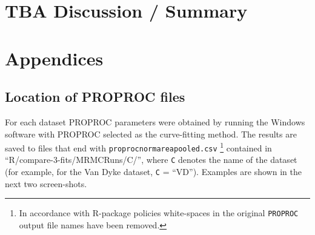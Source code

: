 \documentclass[
]{book}
\begin{document}
\hypertarget{rsm-3-fits-discussion-summary}{%
\section{TBA Discussion / Summary}\label{rsm-3-fits-discussion-summary}}

\hypertarget{rsm-3-fits-appendices}{%
\section{Appendices}\label{rsm-3-fits-appendices}}

\hypertarget{rsm-3-fits-one-dataset-proproc}{%
\subsection{Location of PROPROC files}\label{rsm-3-fits-one-dataset-proproc}}

For each dataset PROPROC parameters were obtained by running the Windows software with PROPROC selected as the curve-fitting method. The results are saved to files that end with \texttt{proprocnormareapooled.csv} \footnote{In accordance with R-package policies white-spaces in the original \texttt{PROPROC} output file names have been removed.} contained in ``R/compare-3-fits/MRMCRuns/C/'', where \texttt{C} denotes the name of the dataset (for example, for the Van Dyke dataset, \texttt{C} = ``VD''). Examples are shown in the next two screen-shots.
\end{document}
